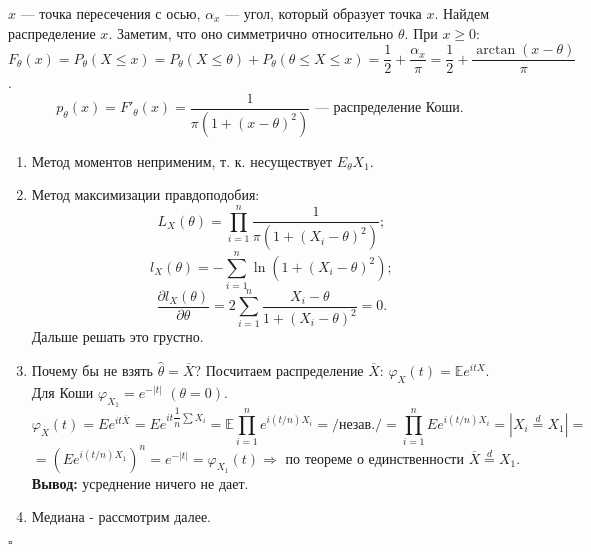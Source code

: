 \documentclass[12pt]{report}
\newenvironment{solution}{{\bfseries Решение:}}{$\square$\\\\}
\theoremstyle{definition}
\begin{document}
\begin{solution}
	$x$ — точка пересечения с осью, $\alpha_x$ — угол, который образует точка $x$. Найдем распределение $x$. Заметим, что оно симметрично относительно $\theta$. При $x \geqslant 0$: $F_\theta(x) = P_\theta(X \leqslant x) = P_\theta(X \leqslant \theta) + P_\theta(\theta \leqslant X \leqslant x) = \dfrac{1}{2} + \dfrac{\alpha_x}{\pi} = \dfrac{1}{2} + \dfrac{\arctan\left(x - \theta\right)}{\pi}$.
	$$p_\theta(x) = F'_\theta(x) = \dfrac{1}{\pi(1 + (x - \theta)^2)} \text{ — распределение Коши}.$$

	\begin{enumerate}
		\item Метод моментов неприменим, т. к. несуществует $E_\theta X_1$.
		\item Метод максимизации правдоподобия: $$L_X(\theta) = \prod_{i=1}^n \dfrac{1}{\pi(1 + (X_i - \theta)^2)};$$ $$l_X(\theta) = -\sum_{i=1}^n \ln(1 + (X_i - \theta)^2);$$ $$\dfrac{\partial l_X(\theta)}{\partial \theta} = 2\sum_{i = 1}^n \dfrac{X_i - \theta}{1 + (X_i - \theta)^2} = 0.$$ Дальше решать это грустно.
		\item Почему бы не взять $\hat{\theta} = \overline{X}$? Посчитаем распределение $\overline{X}$: $\varphi_X(t) = \mathbb{E} e^{itX}$. Для Коши $\varphi_{X_1} = e^{-|t|}$ $(\theta = 0)$.
		$$\varphi_{\overline{X}} (t) = E e^{it\overline{X}} = Ee^{it\dfrac{1}{n} \sum X_i} = \mathbb{E}\prod_{i=1}^n e^{i(t/n)X_i} = /\text{незав.}/ = \prod_{i=1}^n Ee^{i(t/n)X_i} = |X_i \stackrel{d}{=} X_1| = $$ $$=\left(Ee^{i(t/n)X_1}\right)^n = e^{-|t|} = \varphi_{X_1}(t) \Rightarrow \text{ по теореме о единственности } \overline{X} \stackrel{d}{=} X_1.$$
		\textbf{Вывод:} усреднение ничего не дает.
		\item Медиана - рассмотрим далее.
	\end{enumerate}
\end{solution}
\end{document}
